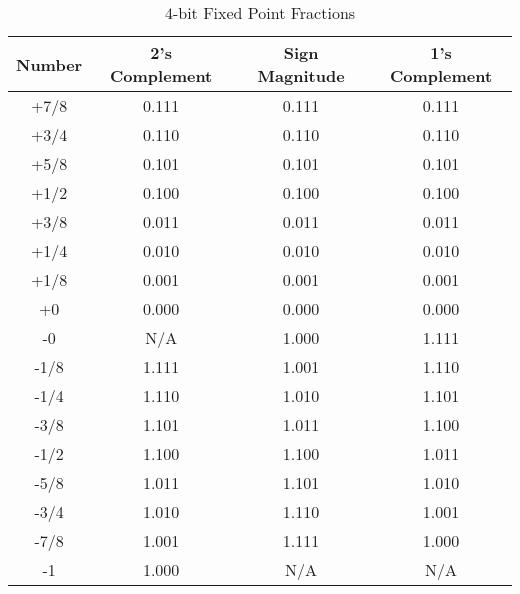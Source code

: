 \documentclass[times, twocolumn, 10pt]{article}
\begin{document}
\begin{table*} [t!]
  \centering
  \begin{tabular}{|c|c|c|c|} \hline
    Number  & 2's Complement & Sign Magnitude & 1's Complement \\ \hline \hline
    +7/8   &      0.111     &    0.111       &      0.111      \\ \hline
    +3/4   &      0.110     &    0.110       &      0.110      \\ \hline
    +5/8   &      0.101     &    0.101       &      0.101      \\ \hline
    +1/2   &      0.100     &    0.100       &      0.100      \\ \hline
    +3/8   &      0.011     &    0.011       &      0.011      \\ \hline
    +1/4   &      0.010     &    0.010       &      0.010      \\ \hline
    +1/8   &      0.001     &    0.001       &      0.001      \\ \hline
    +0     &      0.000     &    0.000       &      0.000      \\ \hline
    -0     &       N/A      &    1.000       &      1.111      \\ \hline
    -1/8   &      1.111     &    1.001       &      1.110      \\ \hline
    -1/4   &      1.110     &    1.010       &      1.101      \\ \hline
    -3/8   &      1.101     &    1.011       &      1.100      \\ \hline
    -1/2   &      1.100     &    1.100       &      1.011      \\ \hline
    -5/8   &      1.011     &    1.101       &      1.010      \\ \hline
    -3/4   &      1.010     &    1.110       &      1.001      \\ \hline
    -7/8   &      1.001     &    1.111       &      1.000      \\ \hline
    -1     &      1.000     &     N/A        &       N/A       \\ \hline
  \end{tabular}
  \caption{$4$-bit Fixed Point Fractions}
\end{table*}
\end{document}
